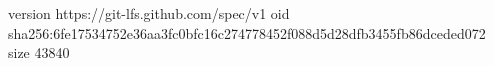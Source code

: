 version https://git-lfs.github.com/spec/v1
oid sha256:6fe17534752e36aa3fc0bfc16c274778452f088d5d28dfb3455fb86dceded072
size 43840
